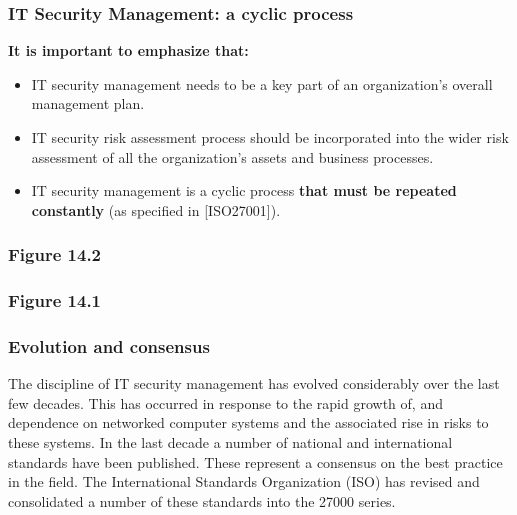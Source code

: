 \documentclass[xcolor ={table,usenames,dvipsnames}]{beamer}
\theoremstyle{definition}
\begin{document}
	\begin{frame}
		\frametitle{IT Security Management: a cyclic process}
	    \textbf{It is important to emphasize that:}
	    \begin{itemize}
	    	\item IT security management needs to be a key part of an organization’s overall management plan.
	    	\item IT security risk assessment process should be incorporated into the
	    	wider risk assessment of all the organization’s assets and business processes.
	    	\item IT security management is a cyclic process \textbf{that must be repeated constantly} (as specified in [ISO27001]).
	    \end{itemize} 
	\end{frame}
	
	\begin{frame}
		\frametitle{Figure 14.2}
	\end{frame}
	
	\begin{frame}
		\frametitle{Figure 14.1}
	\end{frame}
	
	\begin{frame}
		\frametitle{Evolution and consensus}
		The discipline of IT security management has evolved considerably over the last few decades. This has occurred in response to the rapid growth of, and dependence on networked computer systems and the associated rise in risks to these systems. In the last	decade a number of national and international standards have been published. These represent a consensus on the best practice in the field. The International Standards Organization (ISO) has revised and consolidated a number of these standards into the 27000 series.
	\end{frame}
\end{document}
